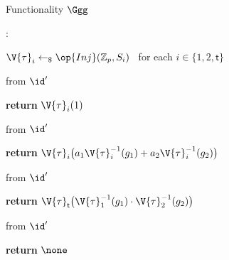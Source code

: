 \begin{interface}[nofloat]{Functionality $\Ggg$ \\
}

{\scriptsize
\setlength{\columnsep}{1.4em}
\begin{multicols}{2}
:
\begin{algorithmic}[1]
\setcounter{contline}{0}\algcont
\State $\V{\tau}_i \gets_{\$} \op{Inj}(\mathbb{Z}_p, S_i)$ \ for each $i \in \{1,2,\mathsf{t}\}$ \label{ln:ggenc}
\algsave
\end{algorithmic}
\vspace{1.4ex}

 \quad from $\id'$
\begin{algorithmic}[1]
\algcont
{}
\State \textbf{return} $\V{\tau}_i(1)$ \label{ln:ggcanon}
\algsave
\end{algorithmic}
\vspace{1.4ex}

\columnbreak

 \quad from $\id'$
\begin{algorithmic}[1]
\algcont
{} \label{ln:ggopreq}
\State \textbf{return} $\V{\tau}_i\bigl(a_1 \V{\tau}_i^{-1}(g_1) + a_2 \V{\tau}_i^{-1}(g_2)\bigr)$ \label{ln:ggop}
\algsave
\end{algorithmic}
\vspace{1.4ex}

 \quad from $\id'$
\begin{algorithmic}[1]
\algcont
{} \label{ln:ggpairreq}
\State \textbf{return} $\V{\tau}_{\mathsf{t}}\bigl(\V{\tau}_1^{-1}(g_1) \cdot \V{\tau}_2^{-1}(g_2)\bigr)$ \label{ln:ggpair}
\algsave
\end{algorithmic}
\vspace{1.4ex}

 \quad from $\id'$
\begin{algorithmic}[1]
\algcont
\State \textbf{return} $\none$ \label{ln:ggleak}
\algsave
\end{algorithmic}
\end{multicols}}
\end{interface}
